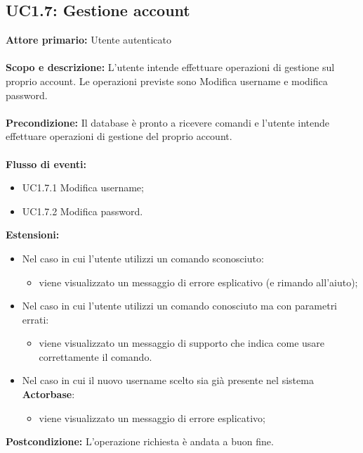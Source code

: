\documentclass{scalatekids-article}
\begin{document}
\subsection{UC1.7: Gestione account}
\textbf{Attore primario:} Utente autenticato\\ \\
\textbf{Scopo e descrizione:} L'utente intende effettuare operazioni di gestione sul proprio account. Le operazioni previste sono
Modifica username e modifica password.\\ \\
\textbf{Precondizione:} Il database è pronto a ricevere comandi e l'utente intende effettuare operazioni di gestione del proprio account.\\ \\
\textbf{Flusso di eventi:}
\begin{itemize}
\item UC1.7.1 Modifica username;
\item UC1.7.2 Modifica password.
\end{itemize}
\textbf{Estensioni:}
\begin{itemize}
\item Nel caso in cui l'utente utilizzi un comando sconosciuto:
  \begin{itemize}
  \item viene visualizzato un messaggio di errore esplicativo (e rimando all'aiuto);
  \end{itemize}
\item Nel caso in cui l'utente utilizzi un comando conosciuto ma con parametri errati:
  \begin{itemize}
  \item viene visualizzato un messaggio di supporto che indica come usare correttamente il comando.
  \end{itemize}
\item Nel caso in cui il nuovo username scelto sia già presente nel sistema \textbf{Actorbase}:
  \begin{itemize}
  \item viene visualizzato un messaggio di errore esplicativo;
  \end{itemize}
\end{itemize}
\textbf{Postcondizione:} L'operazione richiesta è andata a buon fine.
\end{document}
